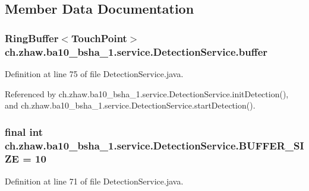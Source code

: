 \subsection{Member Data Documentation}
\hypertarget{classch_1_1zhaw_1_1ba10__bsha__1_1_1service_1_1DetectionService_a9188c843a530615bdd8c2e031879224b}{
\subsubsection[{buffer}]{\setlength{\rightskip}{0pt plus 5cm}RingBuffer$<${\bf TouchPoint}$>$ {\bf ch.zhaw.ba10\_\-bsha\_\-1.service.DetectionService.buffer}}}
\label{classch_1_1zhaw_1_1ba10__bsha__1_1_1service_1_1DetectionService_a9188c843a530615bdd8c2e031879224b}


Definition at line 75 of file DetectionService.java.

Referenced by ch.zhaw.ba10\_\-bsha\_\-1.service.DetectionService.initDetection(), and ch.zhaw.ba10\_\-bsha\_\-1.service.DetectionService.startDetection().\hypertarget{classch_1_1zhaw_1_1ba10__bsha__1_1_1service_1_1DetectionService_a9702db5e460b3123f4c475b05ed6942f}{
\subsubsection[{BUFFER\_\-SIZE}]{\setlength{\rightskip}{0pt plus 5cm}final int {\bf ch.zhaw.ba10\_\-bsha\_\-1.service.DetectionService.BUFFER\_\-SIZE} = 10}}
\label{classch_1_1zhaw_1_1ba10__bsha__1_1_1service_1_1DetectionService_a9702db5e460b3123f4c475b05ed6942f}


Definition at line 71 of file DetectionService.java.

